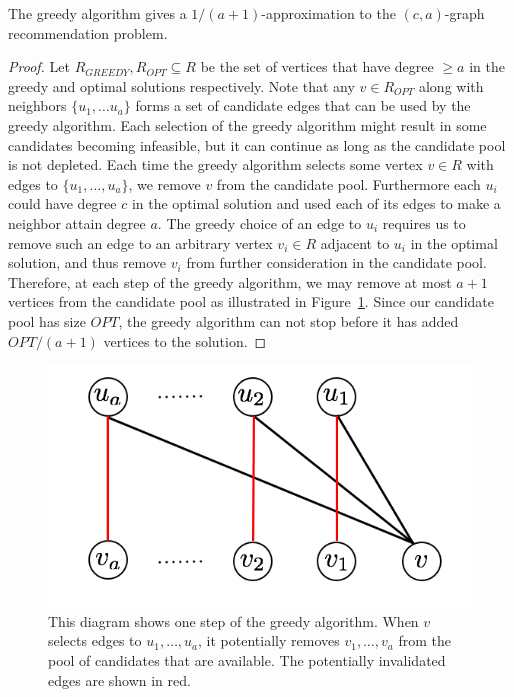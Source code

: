 \begin{thm}
The greedy algorithm gives a $1/(a+1)$-approximation to the $(c,a)$-graph
recommendation problem.
\end{thm}
\begin{proof}
Let $R_{GREEDY}, R_{OPT}\subseteq R$ be the set of vertices that have
degree $\geq a$ in the greedy and optimal solutions respectively. Note
that any $v \in R_{OPT}$ along with neighbors $\{u_1,\ldots u_a\}$
forms a set of candidate edges that can be used by the greedy
algorithm.
Each selection of the greedy algorithm might result in
some candidates becoming infeasible, but it can continue as long as the candidate pool is not depleted.
Each time the greedy algorithm selects some vertex $v\in
R$ with edges to $\{u_1,\ldots, u_a\}$, we remove $v$ from the candidate pool.
Furthermore each $u_i$ could have degree $c$ in the optimal solution and used each of its edges to make a neighbor attain degree $a$. The greedy choice of an edge to $u_i$ requires us to remove such an edge to an arbitrary vertex $v_i\in R$ adjacent to $u_i$ in the optimal
solution, and thus remove $v_i$ from further consideration in the candidate pool.
Therefore, at each step of
the greedy algorithm, we may remove at most $a+1$ vertices from
the candidate pool as illustrated in Figure~\ref{fig:greedy}. Since our candidate pool has size $OPT$, the
greedy algorithm can not stop before it has added $OPT/(a+1)$
vertices to the solution.
\end{proof}

\begin{figure}[H]
\label{fig:greedy}
\centering
\includegraphics[width=.39\textwidth]{images/greedy.png}
\caption{This diagram shows one step of the greedy algorithm. When $v$ selects edges to $u_1,\ldots, u_a$, it potentially removes $v_1,\ldots, v_a$ from the pool of candidates that are available. The potentially invalidated edges are shown in red.}
\end{figure}

